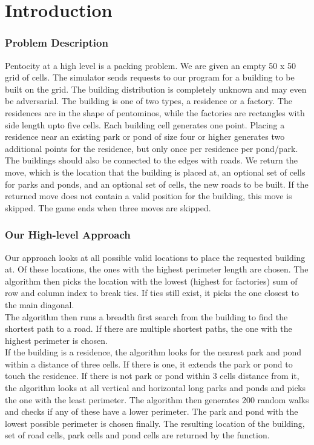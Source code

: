 \section{Introduction}
\subsubsection{Problem Description}
Pentocity at a high level is a packing problem. We are given an empty 50 x 50 grid of cells. The simulator sends requests to our program for a building to be built on the grid. The building distribution is completely unknown and may even be adversarial. The building is one of two types, a residence or a factory. The residences are in the shape of pentominos, while the factories are rectangles with side length upto five cells. Each building cell generates one point. Placing a residence near an existing park or pond of size four or higher generates two additional points for the residence, but only once per residence per pond/park. The buildings should also be connected to the edges with roads. We return the move, which is the location that the building is placed at, an optional set of cells for parks and ponds, and an optional set of cells, the new roads to be built. If the returned move does not contain a valid position for the building, this move is skipped. The game ends when three moves are skipped.\\
\subsubsection{Our High-level Approach}
Our approach looks at all possible valid locations to place the requested building at. Of these locations, the ones with the highest perimeter length are chosen. The algorithm then picks the location with the lowest (highest for factories) sum of row and column index to break ties. If ties still exist, it picks the one closest to the main diagonal.\\
The algorithm then runs a breadth first search from the building to find the shortest path to a road. If there are multiple shortest paths, the one with the highest perimeter is chosen.\\
If the building is a residence, the algorithm looks for the nearest park and pond within a distance of three cells. If there is one, it extends the park or pond to touch the residence. If there is not park or pond within 3 cells distance from it, the algorithm looks at all vertical and horizontal long parks and ponds and picks the one with the least perimeter. The algorithm then generates 200 random walks and checks if any of these have a lower perimeter. The park and pond with the lowest possible perimeter is chosen finally. The resulting location of the building, set of road cells, park cells and pond cells are returned by the function.
